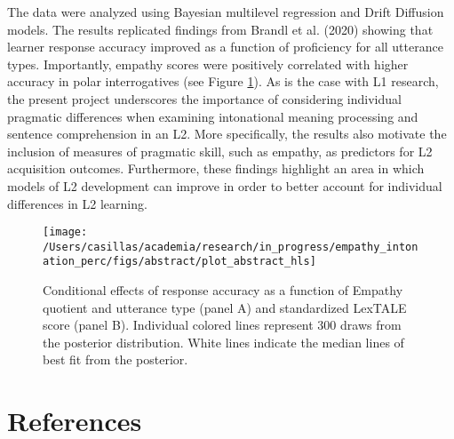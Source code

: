 \documentclass[
  12pt,
]{article}
\begin{document}
The data were analyzed using Bayesian multilevel regression and Drift
Diffusion models. The results replicated findings from Brandl et al.
(2020) showing that learner response accuracy improved as a function of
proficiency for all utterance types. Importantly, empathy scores were
positively correlated with higher accuracy in polar interrogatives (see
Figure \ref{fig:plot-2panel-emp-prof}). As is the case with L1 research,
the present project underscores the importance of considering individual
pragmatic differences when examining intonational meaning processing and
sentence comprehension in an L2. More specifically, the results also
motivate the inclusion of measures of pragmatic skill, such as empathy,
as predictors for L2 acquisition outcomes. Furthermore, these findings
highlight an area in which models of L2 development can improve in order
to better account for individual differences in L2 learning.

\clearpage

\begin{figure}
\texttt{[image: /Users/casillas/academia/research/in\_progress/empathy\_intonation\_perc/figs/abstract/plot\_abstract\_hls]} \caption{Conditional effects of response accuracy as a function of Empathy 
quotient and utterance type (panel A) and standardized LexTALE score (panel B). 
Individual colored lines represent 300 draws from the posterior distribution. White lines indicate the median lines of best fit from the posterior.}\label{fig:plot-2panel-emp-prof}
\end{figure}

\hypertarget{references}{%
\section{References}\label{references}}

\begingroup
\setlength{\parindent}{-0.5in}
\setlength{\leftskip}{0.5in}

\phantom{.}

\textcolor{white}{\\} \vspace{-0.5in}
\end{document}
